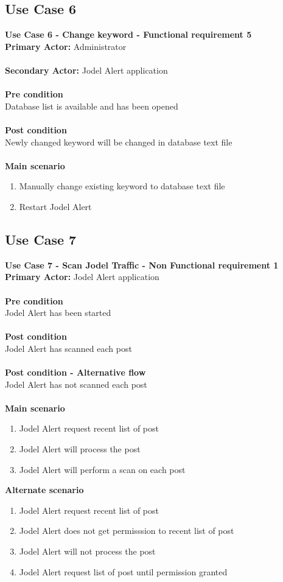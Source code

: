\documentclass[a4paper,12pt]{article}
\begin{document}
\subsection{Use Case 6}
\textbf{Use Case 6 - Change keyword - Functional requirement 5}\\
\textbf{Primary Actor:}
Administrator\\\\
\textbf{Secondary Actor:}
Jodel Alert application\\\\
\textbf{Pre condition}\\
Database list is available and has been opened\\\\
\textbf{Post condition}\\
Newly changed keyword will be changed in database text file\\\\
\textbf{Main scenario}
\begin{enumerate}
	\item Manually change existing keyword to database text file
	\item Restart Jodel Alert
\end{enumerate}
\clearpage
\subsection{Use Case 7}
\textbf{Use Case 7 - Scan Jodel Traffic - Non Functional requirement 1}\\
\textbf{Primary Actor:}
Jodel Alert application\\\\
\textbf{Pre condition}\\
Jodel Alert has been started\\\\
\textbf{Post condition}\\
Jodel Alert has scanned each post\\\\
\textbf{Post condition - Alternative flow}\\
Jodel Alert has not scanned each post\\\\
\textbf{Main scenario}
\begin{enumerate}
	\item Jodel Alert request recent list of post
	\item Jodel Alert will process the post
	\item Jodel Alert will perform a scan on each post
\end{enumerate}
\textbf{Alternate scenario}
\begin{enumerate}
	\item Jodel Alert request recent list of post
	\item Jodel Alert does not get permisssion to recent list of post
	\item Jodel Alert will not process the post
	\item Jodel Alert request list of post until permission granted
\end{enumerate}
\end{document}
